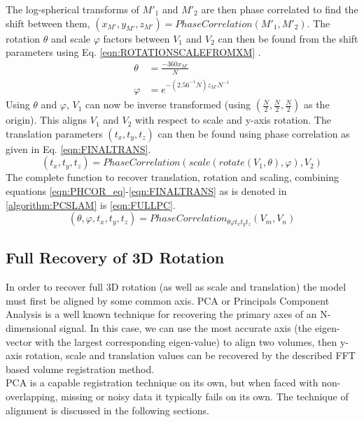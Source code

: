 The log-spherical transforms of $M'_1$ and $M'_2$ are then phase correlated to find the shift between them, $(x_{M'},y_{M'},z_{M'}) = PhaseCorrelation(M'_1, M'_2)$. The rotation $\theta$ and scale $\varphi$ factors between $V_1$ and $V_2$ can then be found from the shift parameters using Eq. \ref{eqn:ROTATIONSCALEFROMXM} . 
\begin{equation} \label{eqn:ROTATIONSCALEFROMXM}
\begin{split}
\theta & = \frac{-360x_{M'}}{N}\\
\varphi & = e^{
-\left(
2.56^{-1}N
\right)z_{M'}N^{-1}
}
\end{split}
\end{equation}
Using $\theta$ and $\varphi$, $V_1$ can now be inverse transformed (using $(\frac{N}{2}, \frac{N}{2}, \frac{N}{2})$ as the origin). This aligns $V_1$ and $V_2$ with respect to scale and y-axis rotation. The translation parameters $(t_x, t_y, t_z)$ can then be found using phase correlation as given in Eq. \ref{eqn:FINALTRANS}.
\begin{equation} \label{eqn:FINALTRANS}
(t_x, t_y, t_z) = PhaseCorrelation(scale(rotate(V_1,\theta),\varphi), V_2)
\end{equation}
The complete function to recover translation, rotation and scaling, combining equations \ref{eqn:PHCOR_eq}-\ref{eqn:FINALTRANS} as is denoted in \ref{algorithm:PCSLAM} is \ref{eqn:FULLPC}.
\begin{equation} \label{eqn:FULLPC}
(\theta, \varphi, t_x, t_y, t_z) = PhaseCorrelation_{\theta \varphi t_x t_y t_z}(V_m, V_n)
\end{equation}

\subsection{Full Recovery of 3D Rotation}

In order to recover full 3D rotation (as well as scale and translation) the model must first be aligned by some common axis. PCA or Principals Component Analysis is a well known technique for recovering the primary axes of an N-dimensional signal. In this case, we can use the most accurate axis (the eigen-vector with the largest corresponding eigen-value) to align two volumes, then y-axis rotation, scale and translation values can be recovered by the described FFT based volume registration method. \\

PCA is a capable registration technique on its own, but when faced with non-overlapping, missing or noisy data it typically fails on its own. The technique of alignment is discussed in the following sections. \\

